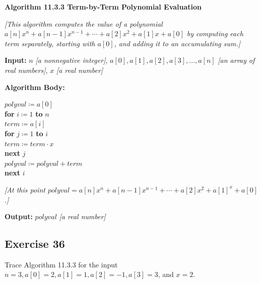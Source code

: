 \documentclass[14pt]{extarticle}
\newcommand{\cy}{\color{cyan}}
\begin{document}
\begin{tcolorbox}[colframe=cyan]
    {\bf \cy Algorithm 11.3.3 Term-by-Term Polynomial Evaluation}

    {\it [This algorithm computes the value of a polynomial \(a[n]x^n + a[n-1]x^{n-1} + \cdots + a[2]x^2 + a[1]x + a[0]\)
    by computing each term separately, starting with \(a[0]\), and adding it to an accumulating sum.]}

    {\bf Input:} \(n\) {\it [a nonnegative integer]}, \(a[0], a[1], a[2], a[3], \ldots, a[n]\) {\it [an array of real
                numbers]}, \(x\) {\it [a real number]}

        {\bf Algorithm Body:}
    \begin{tabbing}
        \(polyval \coloneqq a[0]\) \\
        {\bf for} \= \(i \coloneqq 1\) {\bf to} \(n\) \\
        \> \(term \coloneqq a[i]\) \\
        \> {\bf for} \= \(j \coloneqq 1\) {\bf to} \(i\)\\
        \>           \> \(term \coloneqq term \cdot x\)\\
        \> {\bf next} \(j\) \\
        \> \(polyval \coloneqq polyval + term\) \\
        {\bf next} \(i\)
    \end{tabbing}

    {\it [At this point \(polyval = a[n]x^n + a[n-1]x^{n-1} + \cdots + a[2]x^2 + a[1]^x + a[0]\).]}

    {\bf Output:} \(polyval\) {\it [a real number]}
\end{tcolorbox}

\subsection{Exercise 36}
Trace Algorithm 11.3.3 for the input \(n = 3, a[0] = 2, a[1] = 1, a[2] = -1, a[3] = 3\), and \(x = 2\).
\end{document}
